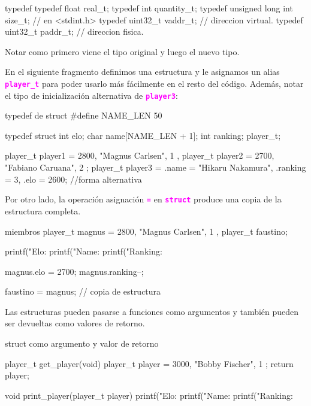 \documentclass[]{scrartcl}
\newcommand{\hl}[1]{\textcolor{magenta}{\textbf{\texttt{#1}}}}
\begin{document}
\begin{cbox}[]{typedef}
typedef float real_t;
typedef int quantity_t;
typedef unsigned long int size_t; // en <stdint.h>
typedef uint32_t vaddr_t; // direccion virtual.
typedef uint32_t paddr_t; // direccion fisica.
\end{cbox}

Notar como primero viene el tipo original y luego el nuevo tipo.

En el siguiente fragmento definimos una estructura y le asignamos un alias \hl{player\_t} para poder usarlo más fácilmente en el resto del código. Además, notar el tipo de inicialización alternativa de \hl{player3}:

\begin{cbox}[]{typedef de struct}
#define NAME_LEN 50

typedef struct {
  int elo;
  char name[NAME_LEN + 1];
  int ranking;
} player_t;

player_t player1 = { 2800, "Magnus Carlsen", 1 },
player_t player2 = { 2700, "Fabiano Caruana", 2 };
player_t player3 = { .name = "Hikaru Nakamura", 
                     .ranking = 3, 
                     .elo = 2600}; //forma alternativa
\end{cbox}

Por otro lado, la operación asignación \hl{=} en \hl{struct} produce una copia de la estructura completa.

\begin{cbox}[]{miembros}
player_t magnus = { 2800, "Magnus Carlsen", 1 },
player_t faustino;

printf("Elo: %
printf("Name: %
printf("Ranking: %

magnus.elo = 2700;
magnus.ranking--;

faustino = magnus; // copia de estructura
\end{cbox}

Las estructuras pueden pasarse a funciones como argumentos y también pueden ser devueltas como valores de retorno.

\begin{cbox}[]{struct como argumento y valor de retorno}

player_t get_player(void) {
  player_t player = { 3000, "Bobby Fischer", 1 };
  return player;
}

void print_player(player_t player) {
  printf("Elo: %
  printf("Name: %
  printf("Ranking: %
}

\end{cbox}
\end{document}
